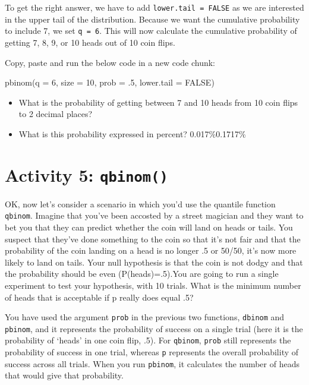 \documentclass[
  oneside]{book}
\newenvironment{Shaded}{\begin{snugshade}}{\end{snugshade}}
\newcommand{\AttributeTok}[1]{\textcolor[rgb]{0.77,0.63,0.00}{#1}}
\newcommand{\ConstantTok}[1]{\textcolor[rgb]{0.00,0.00,0.00}{#1}}
\newcommand{\DecValTok}[1]{\textcolor[rgb]{0.00,0.00,0.81}{#1}}
\newcommand{\FunctionTok}[1]{\textcolor[rgb]{0.00,0.00,0.00}{#1}}
\newcommand{\NormalTok}[1]{#1}
\providecommand{\tightlist}{%
  \setlength{\itemsep}{0pt}\setlength{\parskip}{0pt}}
\begin{document}
To get the right answer, we have to add \texttt{lower.tail\ =\ FALSE} as we are interested in the upper tail of the distribution. Because we want the cumulative probability to include 7, we set \texttt{q\ =\ 6}. This will now calculate the cumulative probability of getting 7, 8, 9, or 10 heads out of 10 coin flips.

Copy, paste and run the below code in a new code chunk:

\begin{Shaded}
\begin{Highlighting}[]
\FunctionTok{pbinom}\NormalTok{(}\AttributeTok{q =} \DecValTok{6}\NormalTok{, }\AttributeTok{size =} \DecValTok{10}\NormalTok{, }\AttributeTok{prob =}\NormalTok{ .}\DecValTok{5}\NormalTok{, }\AttributeTok{lower.tail =} \ConstantTok{FALSE}\NormalTok{) }
\end{Highlighting}
\end{Shaded}

\begin{itemize}
\tightlist
\item
  What is the probability of getting between 7 and 10 heads from 10 coin flips to 2 decimal places? \\
\item
  What is this probability expressed in percent? 0.017\%0.1717\%
\end{itemize}

\hypertarget{activity-5-qbinom}{%
\section{\texorpdfstring{Activity 5: \texttt{qbinom()}}{Activity 5: qbinom()}}\label{activity-5-qbinom}}

OK, now let's consider a scenario in which you'd use the quantile function \texttt{qbinom}. Imagine that you've been accosted by a street magician and they want to bet you that they can predict whether the coin will land on heads or tails. You suspect that they've done something to the coin so that it's not fair and that the probability of the coin landing on a head is no longer .5 or 50/50, it's now more likely to land on tails. Your null hypothesis is that the coin is not dodgy and that the probability should be even (P(heads)=.5).You are going to run a single experiment to test your hypothesis, with 10 trials. What is the minimum number of heads that is acceptable if p really does equal .5?

You have used the argument \texttt{prob} in the previous two functions, \texttt{dbinom} and \texttt{pbinom}, and it represents the probability of success on a single trial (here it is the probability of `heads' in one coin flip, .5). For \texttt{qbinom}, \texttt{prob} still represents the probability of success in one trial, whereas \texttt{p} represents the overall probability of success across all trials. When you run \texttt{pbinom}, it calculates the number of heads that would give that probability.
\end{document}
